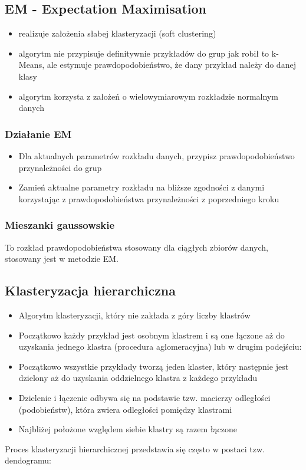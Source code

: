 \documentclass[a4paper,15pt]{article}
\begin{document}
\subsection{EM - Expectation Maximisation}
\begin{itemize}
\item realizuje założenia słabej klasteryzacji (soft clustering)
\item algorytm nie przypisuje definitywnie przykładów do grup jak robił to k-Means, ale estymuje prawdopodobieństwo, że dany przykład należy do danej klasy
\item algorytm korzysta z założeń o wielowymiarowym rozkładzie normalnym danych 
\end{itemize}

\subsubsection{Działanie EM}
\begin{itemize}
\item Dla aktualnych parametrów rozkładu danych, przypisz prawdopodobieństwo przynależności do grup
\item Zamień aktualne parametry rozkładu na bliższe zgodności z danymi korzystając z prawdopodobieństwa przynależności z poprzedniego kroku
\end{itemize}

\subsubsection{Mieszanki gaussowskie}
To rozkład prawdopodobieństwa stosowany dla ciągłych zbiorów danych, stosowany jest w metodzie EM.


\subsection{Klasteryzacja hierarchiczna}
\begin{itemize}
\item Algorytm klasteryzacji, który nie zakłada z góry liczby klastrów
\item Początkowo każdy przykład jest osobnym klastrem i są one łączone aż do uzyskania jednego klastra (procedura aglomeracyjna) lub w drugim podejściu:
\item Początkowo wszystkie przykłady tworzą jeden klaster, który następnie jest dzielony aż do uzyskania oddzielnego klastra z każdego przykładu
\item Dzielenie i łączenie odbywa się na podstawie tzw. macierzy odległości (podobieństw), która zwiera odległości pomiędzy klastrami
\item Najbliżej położone względem siebie klastry są razem łączone
\end{itemize}
Proces klasteryzacji hierarchicznej przedstawia się często w postaci tzw. dendogramu:
\end{document}
